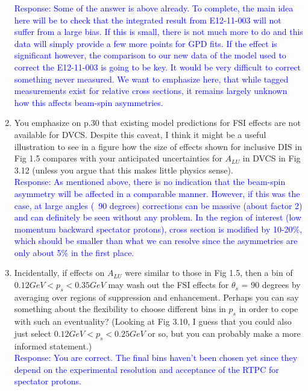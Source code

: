 \documentclass[a4paper,11pt,twoside]{article}
\begin{document}
\begin{enumerate}
\textcolor{blue}{Response: Some of the answer is above already. To complete, 
      the main idea here will be to check that the integrated result from 
      E12-11-003 will not suffer from a large bias. If this is small, there is 
      not much more to do and this data will simply provide a few more points 
      for GPD fits. If the effect is significant however, the comparison to our 
      new data of the model used to correct the E12-11-003 is going to be key.  
      It would be very difficult to correct something never measured. We want 
      to emphasize here, that while tagged measurements exist for relative 
      cross sections, it remains largely unknown how this affects beam-spin 
      asymmetries.}\\

\item You emphasize on p.30 that existing model predictions for FSI effects are
not available for DVCS.  Despite this caveat, I think it might be a useful
illustration to see in a figure how the size of effects shown for inclusive
      DIS in Fig 1.5 compares with your anticipated uncertainties for $A_{LU}$ 
      in DVCS in Fig 3.12 (unless you argue that this makes little physics 
      sense).\\

\textcolor{blue}{Response: As mentioned above, there is no indication that the
beam-spin asymmetry will be affected in a comparable manner. However,
if this was the case, at large angles (~90 degrees) corrections can be
massive (about factor 2) and can definitely be seen without any
problem. In the region of interest (low momentum backward spectator
protons), cross section is modified by 10-20\%, which should be smaller
than what we can resolve since the asymmetries are only about 5\% in
      the first place.}\\

\item  Incidentally, if effects on $A_{LU}$ were similar to those in Fig 1.5, 
   then a bin of $0.12 GeV < p_{s} < 0.35 GeV$ may wash out the FSI effects for 
   $\theta_s$ = 90 degrees by averaging over regions of suppression and 
   enhancement. Perhaps you can say something about the flexibility to choose 
   different bins in $p_s$ in order to cope with such an eventuality?  (Looking 
   at Fig 3.10, I guess that you could also just select $0.12 GeV < p_s < 0.25 
   GeV$ or so, but you can probably make a more informed statement.)\\

\textcolor{blue}{Response: You are correct. The final bins haven't been chosen 
yet since they depend on the experimental resolution and acceptance of the RTPC 
for spectator protons.}\\


\end{enumerate}
\end{document}
